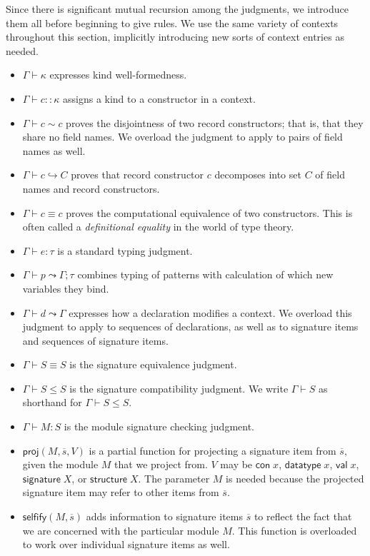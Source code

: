 \documentclass{article}
\newcommand{\mt}[1]{\mathsf{#1}}
\begin{document}
Since there is significant mutual recursion among the judgments, we introduce them all before beginning to give rules.  We use the same variety of contexts throughout this section, implicitly introducing new sorts of context entries as needed.
\begin{itemize}
\item $\Gamma \vdash \kappa$ expresses kind well-formedness.
\item $\Gamma \vdash c :: \kappa$ assigns a kind to a constructor in a context.
\item $\Gamma \vdash c \sim c$ proves the disjointness of two record constructors; that is, that they share no field names.  We overload the judgment to apply to pairs of field names as well.
\item $\Gamma \vdash c \hookrightarrow C$ proves that record constructor $c$ decomposes into set $C$ of field names and record constructors.
\item $\Gamma \vdash c \equiv c$ proves the computational equivalence of two constructors.  This is often called a \emph{definitional equality} in the world of type theory.
\item $\Gamma \vdash e : \tau$ is a standard typing judgment.
\item $\Gamma \vdash p \leadsto \Gamma; \tau$ combines typing of patterns with calculation of which new variables they bind.
\item $\Gamma \vdash d \leadsto \Gamma$ expresses how a declaration modifies a context.  We overload this judgment to apply to sequences of declarations, as well as to signature items and sequences of signature items.
\item $\Gamma \vdash S \equiv S$ is the signature equivalence judgment.
\item $\Gamma \vdash S \leq S$ is the signature compatibility judgment.  We write $\Gamma \vdash S$ as shorthand for $\Gamma \vdash S \leq S$.
\item $\Gamma \vdash M : S$ is the module signature checking judgment.
\item $\mt{proj}(M, \overline{s}, V)$ is a partial function for projecting a signature item from $\overline{s}$, given the module $M$ that we project from.  $V$ may be $\mt{con} \; x$, $\mt{datatype} \; x$, $\mt{val} \; x$, $\mt{signature} \; X$, or $\mt{structure} \; X$.  The parameter $M$ is needed because the projected signature item may refer to other items from $\overline{s}$.
\item $\mt{selfify}(M, \overline{s})$ adds information to signature items $\overline{s}$ to reflect the fact that we are concerned with the particular module $M$.  This function is overloaded to work over individual signature items as well.
\end{itemize}
\end{document}
